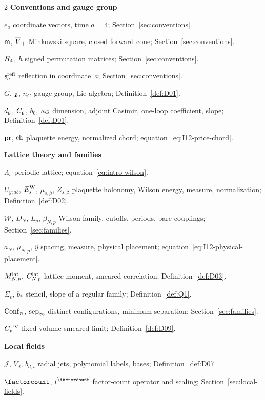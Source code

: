 \begin{multicols}{2}
\footnotesize
\setlength{\parindent}{0pt}
\setlength{\parskip}{1pt}
\raggedcolumns
{}
\textbf{Conventions and gauge group}\par
$e_a$ coordinate vectors, time $a=4$; Section~\ref{sec:conventions}.

$\mathsf{m}$, $\overline{V}_+$ Minkowski square, closed forward cone; Section~\ref{sec:conventions}.

$H_4$, $h$ signed permutation matrices; Section~\ref{sec:conventions}.

$\mathsf s_a^{\rm refl}$ reflection in coordinate~$a$; Section~\ref{sec:conventions}.

$G$, $\mathfrak{g}$, $n_G$ gauge group, Lie algebra; Definition~\ref{def:D01}.

$d_{\mathfrak{g}}$, $C_{\mathfrak{g}}$, $b_0$, $\kappa_G$ dimension, adjoint Casimir, one-loop coefficient, slope; Definition~\ref{def:D01}.

$\operatorname{pr}$, $\operatorname{ch}$ plaquette energy, normalized chord; equation~\eqref{eq:I12-price-chord}.

\medskip\textbf{Lattice theory and families}\par
$\Lambda_s$ periodic lattice; equation~\eqref{eq:intro-wilson}.

$U_{y;ab}$, $E_s^{\rm W}$, $\mu_{s,\beta}$, $Z_{s,\beta}$ plaquette holonomy, Wilson energy, measure, normalization; Definition~\ref{def:D02}.

$\mathcal W$, $D_N$, $L_p$, $\beta_{N,p}$ Wilson family, cutoffs, periods, bare couplings; Section~\ref{sec:families}.

$a_N$, $\mu_{N,p}$, $\hat y$ spacing, measure, physical placement; equation~\eqref{eq:I12-physical-placement}.

$M^{\mathrm{lat}}_{N,p}$, $C^{\mathrm{lat}}_{N,p}$ lattice moment, smeared correlation; Definition~\ref{def:D03}.

$\Sigma_v$, $b_*$ stencil, slope of a regular family; Definition~\ref{def:Q1}.

$\mathrm{Conf}_{n}$, $\operatorname{sep}_{\infty}$ distinct configurations, minimum separation; Section~\ref{sec:families}.

$C_p^{\rm UV}$ fixed-volume smeared limit; Definition~\ref{def:D09}.

\medskip\textbf{Local fields}\par
$\mathcal J$, $V_d$, $b_{d,i}$ radial jets, polynomial labels, bases; Definition~\ref{def:D07}.

$\factorcount$, $t^{\factorcount}$ factor-count operator and scaling; Section~\ref{sec:local-fields}.


\end{multicols}
